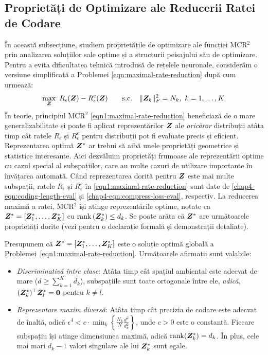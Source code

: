 \documentclass[../../book-main_ro.tex]{subfiles}
\begin{document}
\vspace{-0.1in}

\subsection{Proprietăți de Optimizare ale Reducerii Ratei de Codare}
\label{sec:MCR-landscape}

În această subsecțiune, studiem proprietățile de optimizare ale funcției MCR$^2$ prin analizarea soluțiilor sale optime și a structurii peisajului său de optimizare. Pentru a evita dificultatea tehnică introdusă de rețelele neuronale, considerăm o versiune simplificată a Problemei \eqref{eqn:maximal-rate-reduction} după cum urmează:
\begin{align}\label{eqn1:maximal-rate-reduction}
    \max_{\bm Z}\ R_{\epsilon}(\bm{Z}) - R_{\epsilon}^c(\bm{Z})\qquad \mathrm{s.c.}\quad \|\bm Z_k\|_F^2 = N_k,\ k =1,\dots,K. 
\end{align}
În teorie, principiul MCR$^2$ \eqref{eqn1:maximal-rate-reduction} beneficiază de o mare generalizabilitate și poate fi aplicat reprezentărilor $\bm{Z}$ ale {\em oricăror} distribuții atâta timp cât ratele $R_\epsilon$ și $R^c_\epsilon$ pentru distribuții pot fi evaluate precis și eficient. Reprezentarea optimă $\bm{Z}^{\ast}$ ar trebui să aibă unele proprietăți geometrice și statistice interesante. Aici dezvăluim proprietăți frumoase ale reprezentării optime cu cazul special al subspațiilor, care au multe cazuri de utilizare importante în învățarea automată. Când reprezentarea dorită pentru $\bm{Z}$ este mai multe subspații, ratele $R_\epsilon$ și $R^c_\epsilon$ în \eqref{eqn1:maximal-rate-reduction} sunt date de \eqref{chap4-eqn:coding-length-eval} și \eqref{chap4-eqn:compress-loss-eval}, respectiv. La reducerea maximă a ratei, MCR$^2$ își atinge reprezentările optime, notate ca $\bm{Z}^{\ast} = [\bm{Z}_1^*,\dots,\bm{Z}_K^*]$ cu $\operatorname{rank}{(\bm{Z}_{k}^*)}\le d_k$. Se poate arăta că $\bm{Z}^{\ast}$ are următoarele proprietăți dorite (vezi \cite{yu2020learning} pentru o declarație formală și demonstrații detaliate).

\begin{theorem}
	Presupunem că $\bm{Z}^{\ast} = [\bm{Z}_1^*,\dots,\bm{Z}_K^*]$ este o soluție optimă globală a Problemei~\eqref{eqn1:maximal-rate-reduction}. Următoarele afirmații sunt valabile:
	\begin{itemize}
		\item {\em Discriminativă între clase}: Atâta timp cât spațiul ambiental este adecvat de mare ($d \ge \sum_{k=1}^{K} d_k$), subspațiile sunt toate ortogonale între ele, {\em adică}, $(\bm{Z}_{k}^*)^{\top} \bm{Z}_{l}^* = \bm{0}$ pentru $k \not= l$.
		\item {\em Reprezentare maxim diversă}:
		      Atâta timp cât precizia de codare este adecvat de înaltă, adică $\epsilon ^4 < c\cdot \min_{k}\left\{ \frac{N_k}{N}\frac{d^2}{d_k^2}\right\}$, unde $c>0$ este o constantă. Fiecare subspațiu își atinge dimensiunea maximă, adică $\mathrm{rank}{(\bm{Z}_{k}^*)}= d_k$. În plus, cele mai mari $d_k-1$ valori singulare ale lui $\bm{Z}_{k}^*$ sunt egale.
		      \label{thm:MCR2-properties}
	\end{itemize}
\end{theorem}
\end{document}
